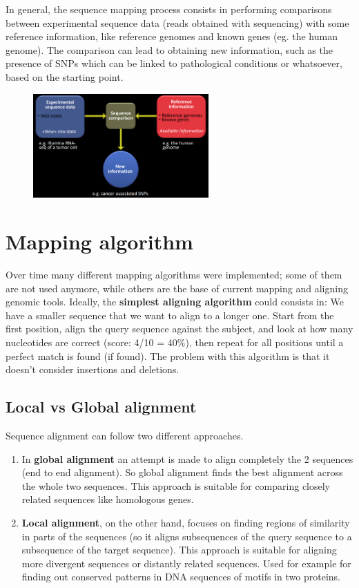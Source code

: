 In general, the sequence mapping process consists in performing comparisons between experimental sequence data (reads obtained with sequencing) with some reference information, like reference genomes and known genes (eg. the human genome). The comparison can lead to obtaining new information, such as the presence of SNPs which can be linked to pathological conditions or whatsoever, based on the starting point.

\begin{figure}[h]
\centering
\includegraphics[width=0.6\textwidth]{SequenceComparison.png}
\caption{}
\end{figure}

\section{Mapping algorithm}

Over time many different mapping algorithms were implemented; some of them are not used anymore, while others are the base of current mapping and aligning genomic tools. 
Ideally, the \textbf{simplest aligning algorithm} could consists in:  
We have a smaller sequence that we want to align to a longer one. Start from the first position, align the query sequence against the subject, and look at how many nucleotides are correct (score: 4/10 = 40$\%$), then repeat for all positions until a perfect match is found (if found). The problem with this algorithm is that it doesn't consider insertions and deletions.

\subsection{Local vs Global alignment}
Sequence alignment can follow two different approaches.

\begin{enumerate}
    \item In \textbf{global alignment} an attempt is made to align completely the 2 sequences (end to end alignment). So global alignment finds the best alignment across the whole two sequences. This approach is suitable for comparing closely related sequences like homologous genes. 
    \item \textbf{Local alignment}, on the other hand, focuses on finding regions of similarity in parts of the sequences (so it aligns subsequences of the query sequence to a subsequence of the target sequence). This approach is suitable for aligning more divergent sequences or distantly related sequences. Used for example for finding out conserved patterns in DNA sequences of motifs in two proteins.
\end{enumerate}

